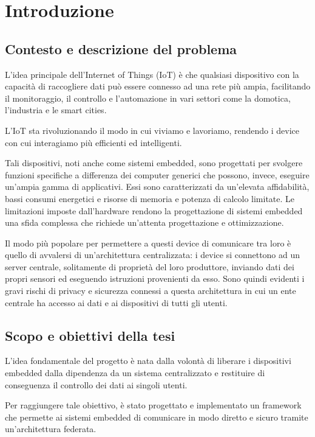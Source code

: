 \chapter{Introduzione}

\section{Contesto e descrizione del problema}

L'idea principale dell'Internet of Things (IoT) è che qualsiasi dispositivo con la capacità di raccogliere
dati può essere connesso ad una rete più ampia, facilitando il monitoraggio, il controllo
e l'automazione in vari settori come la domotica, l'industria e le smart cities.

L'IoT sta rivoluzionando il modo in cui viviamo e lavoriamo, 
rendendo i device con cui interagiamo più efficienti ed intelligenti.

Tali dispositivi, noti anche come sistemi embedded, sono progettati per svolgere funzioni specifiche
a differenza dei computer generici che possono, invece, eseguire un'ampia gamma di applicativi.
Essi sono caratterizzati da un'elevata affidabilità, bassi consumi energetici e
risorse di memoria e potenza di calcolo limitate.
Le limitazioni imposte dall'hardware rendono la progettazione di sistemi embedded una sfida complessa
che richiede un'attenta progettazione e ottimizzazione.

Il modo più popolare per permettere a questi device di comunicare tra loro è quello di avvalersi di un'architettura centralizzata:
i device si connettono ad un server centrale, solitamente di proprietà del loro produttore, inviando dati dei propri sensori 
ed eseguendo istruzioni provenienti da esso. Sono quindi evidenti i gravi rischi di privacy e sicurezza connessi a questa architettura in cui 
un ente centrale ha accesso ai dati e ai dispositivi di tutti gli utenti. 

\section{Scopo e obiettivi della tesi}

L'idea fondamentale del progetto è nata dalla volontà di liberare i dispositivi embedded dalla dipendenza 
da un sistema centralizzato e restituire di conseguenza il controllo dei dati ai singoli utenti.

Per raggiungere tale obiettivo, è stato progettato e implementato un framework che permette ai sistemi embedded
di comunicare in modo diretto e sicuro tramite un'architettura federata.

